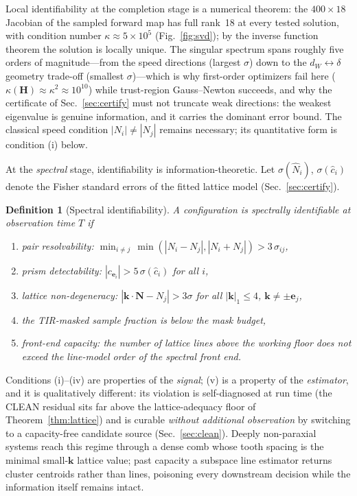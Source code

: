 \documentclass[twocolumn,preprintnumbers,amsmath,amssymb,pra,floatfix]{revtex4-2}
\newcommand{\vect}[1]{\bm{#1}}
\newtheorem{definition}{Definition}
\begin{document}
Local identifiability at the completion stage is a numerical theorem:
the $400\times18$ Jacobian of the sampled forward map has full rank~18
at every tested solution, with condition number
$\kappa\approx5\times10^{5}$ (Fig.~\ref{fig:svd}); by the inverse
function theorem the solution is locally unique.  The singular spectrum
spans roughly five orders of magnitude---from the speed directions
(largest $\sigma$) down to the $d_W\!\leftrightarrow\!\delta$
geometry trade-off (smallest $\sigma$)---which is why
first-order optimizers fail here
($\kappa(\vect{H})\approx\kappa^2\approx10^{10}$) while trust-region
Gauss--Newton succeeds, and why the certificate of
Sec.~\ref{sec:certify} must not truncate weak directions: the weakest
eigenvalue is genuine information, and it carries the dominant error
bound.  The classical speed condition $|N_i|\neq|N_j|$
remains necessary; its quantitative form is condition (i) below.

At the \emph{spectral} stage, identifiability is information-theoretic.
Let $\sigma(\hat N_i)$, $\sigma(\hat c_i)$ denote the Fisher standard
errors of the fitted lattice model (Sec.~\ref{sec:certify}).

\begin{definition}[Spectral identifiability]
\label{def:spectral}
A configuration is spectrally identifiable at observation time $T$ if
\begin{enumerate}
\item[(i)] \emph{pair resolvability}:
  $\min_{i\ne j}\,\min(|N_i-N_j|,|N_i+N_j|) > 3\,\sigma_{ij}$,
\item[(ii)] \emph{prism detectability}:
  $|c_{\vect{e}_i}| > 5\,\sigma(\hat c_i)$ for all $i$,
\item[(iii)] \emph{lattice non-degeneracy}:
  $|\vect{k}\cdot\vect{N}-N_j| > 3\sigma$ for all
  $|\vect{k}|_1\le4$, $\vect{k}\ne\pm\vect{e}_j$,
\item[(iv)] the TIR-masked sample fraction is below the mask budget,
\item[(v)] \emph{front-end capacity}: the number of lattice lines above
  the working floor does not exceed the line-model order of the
  spectral front end.
\end{enumerate}
\end{definition}

Conditions (i)--(iv) are properties of the \emph{signal}; (v) is a
property of the \emph{estimator}, and it is qualitatively different:
its violation is self-diagnosed at run time (the CLEAN residual sits
far above the lattice-adequacy floor of Theorem~\ref{thm:lattice})
and is curable \emph{without additional observation} by switching to a
capacity-free candidate source (Sec.~\ref{sec:clean}).  Deeply
non-paraxial systems reach this regime through a dense comb whose
tooth spacing is the minimal small-$\vect{k}$ lattice value; past
capacity a subspace line estimator returns cluster centroids rather
than lines, poisoning every downstream decision while the information
itself remains intact.
\end{document}
